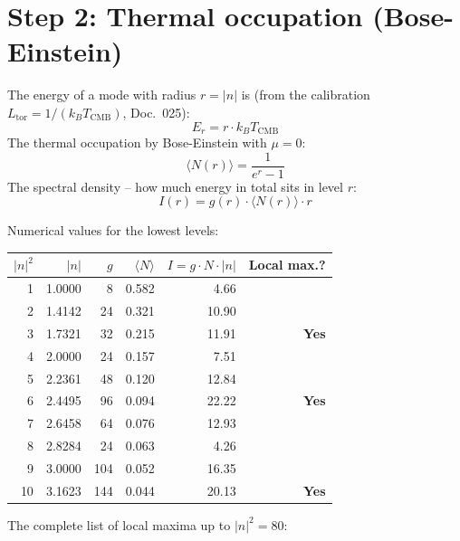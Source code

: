 \section{Step 2: Thermal occupation (Bose-Einstein)}

The energy of a mode with radius $r = |n|$ is (from the calibration
$L_\mathrm{tor} = 1/(k_B T_\mathrm{CMB})$, Doc.~025):
\[
  E_r = r \cdot k_B T_\mathrm{CMB}
\]
The thermal occupation by Bose-Einstein with $\mu = 0$:
\[
  \langle N(r) \rangle = \frac{1}{e^r - 1}
\]
The spectral density -- how much energy in total sits in level $r$:
\[
  \boxed{I(r) = g(r) \cdot \langle N(r) \rangle \cdot r}
\]

Numerical values for the lowest levels:

\begin{center}
\begin{tabular}{rrrrrr}
\toprule
$|n|^2$ & $|n|$ & $g$ & $\langle N\rangle$ & $I = g\cdot N\cdot |n|$ & Local max.? \\
\midrule
1  & 1{.}0000 & 8   & 0{.}582 & 4{.}66  & \\
2  & 1{.}4142 & 24  & 0{.}321 & 10{.}90 & \\
3  & 1{.}7321 & 32  & 0{.}215 & 11{.}91 & \textbf{Yes} \\
4  & 2{.}0000 & 24  & 0{.}157 & 7{.}51  & \\
5  & 2{.}2361 & 48  & 0{.}120 & 12{.}84 & \\
6  & 2{.}4495 & 96  & 0{.}094 & 22{.}22 & \textbf{Yes} \\
7  & 2{.}6458 & 64  & 0{.}076 & 12{.}93 & \\
8  & 2{.}8284 & 24  & 0{.}063 & 4{.}26  & \\
9  & 3{.}0000 & 104 & 0{.}052 & 16{.}35 & \\
10 & 3{.}1623 & 144 & 0{.}044 & 20{.}13 & \textbf{Yes} \\
\bottomrule
\end{tabular}
\end{center}

The complete list of local maxima up to $|n|^2 = 80$:

